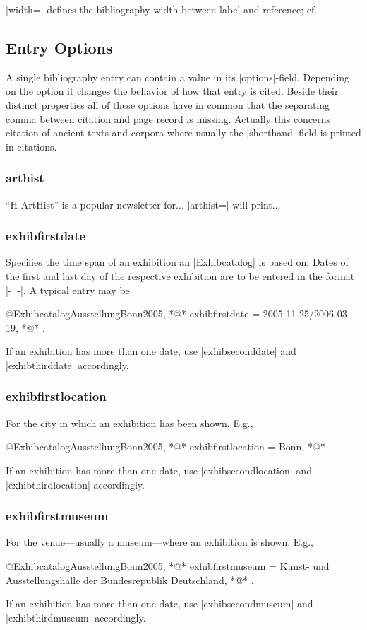 \documentclass[a4paper,
10pt,
ngerman,
english
]{ltxdoc}
\begin{document}
|width=| defines the bibliography width between label and reference; cf. %

\subsection{Entry Options}
A single bibliography entry can contain a value in its |options|-field.
Depending on the option it changes the behavior of how that entry is cited.
Beside their distinct properties all of these options have in common that the separating comma between citation and page record is missing. 
Actually this concerns citation of ancient texts and corpora where usually the |shorthand|-field is printed in citations.

\subsubsection{arthist}
\enquote{H-ArtHist} is a popular newsletter for... %
|arthist=| will print...

\subsubsection{exhibfirstdate}
Specifies the time span of an exhibition an |Exhibcatalog| is based on. Dates of the first and last day of the respective exhibition are to be entered in the format |-||-|. A typical entry may be
\begin{code}
@Exhibcatalog{AusstellungBonn2005,
  *@\ldots@*
  exhibfirstdate = {2005-11-25/2006-03-19},
  *@\ldots@*
}.
\end{code}
If an exhibition has more than one date, use |exhibseconddate| and |exhibthirddate| accordingly.

\subsubsection{exhibfirstlocation}
For the city in which an exhibition has been shown. E.g.,
\begin{code}
@Exhibcatalog{AusstellungBonn2005,
  *@\ldots@*
  exhibfirstlocation = {Bonn},
  *@\ldots@*
}.
\end{code}
If an exhibition has more than one date, use |exhibsecondlocation| and |exhibthirdlocation| accordingly.

\subsubsection{exhibfirstmuseum}
For the venue---usually a museum---where an exhibition is shown. E.g.,
\begin{code}
@Exhibcatalog{AusstellungBonn2005,
  *@\ldots@*
  exhibfirstmuseum = {Kunst- und Ausstellungshalle der Bundesrepublik Deutschland},
  *@\ldots@*
}.
\end{code}
If an exhibition has more than one date, use |exhibsecondmuseum| and |exhibthirdmuseum| accordingly.
\end{document}
